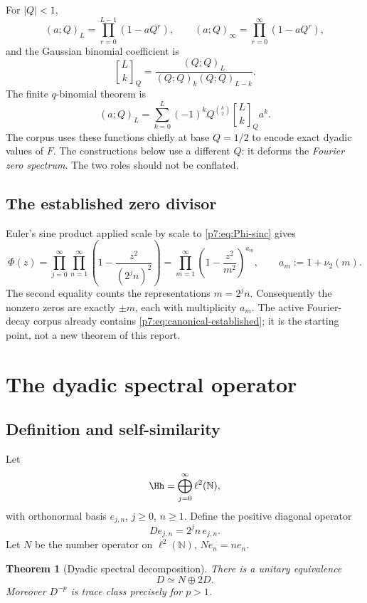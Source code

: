 \documentclass[11pt]{article}
\numberwithin{equation}{section}
\newtheorem{theorem}{Theorem}[section]
\theoremstyle{definition}
\theoremstyle{remark}
\newcommand{\N}{\mathbb N}
\newcommand{\qbinom}[3]{\genfrac{[}{]}{0pt}{}{#1}{#2}_{#3}}
\begin{document}
For $|Q|<1$,
\[
 (a;Q)_L=\prod_{r=0}^{L-1}(1-aQ^r),
 \qquad
 (a;Q)_\infty=\prod_{r=0}^{\infty}(1-aQ^r),
\]
and the Gaussian binomial coefficient is
\[
 \qbinom{L}{k}{Q}=\frac{(Q;Q)_L}{(Q;Q)_k(Q;Q)_{L-k}}.
\]
The finite $q$-binomial theorem is
\begin{equation}\label{p7:eq:q-binomial}
 (a;Q)_L=\sum_{k=0}^{L}(-1)^kQ^{\binom{k}{2}}
 \qbinom{L}{k}{Q}a^k.
\end{equation}
The corpus uses these functions chiefly at base $Q=1/2$ to encode exact dyadic values of $F$.  The constructions below use a different $Q$: it deforms the \emph{Fourier zero spectrum}.  The two roles should not be conflated.

\subsection{The established zero divisor}

Euler's sine product applied scale by scale to \cref{p7:eq:Phi-sinc} gives
\begin{equation}\label{p7:eq:canonical-established}
 \Phi(z)=\prod_{j=0}^{\infty}\prod_{n=1}^{\infty}
 \left(1-\frac{z^2}{(2^jn)^2}\right)
 =\prod_{m=1}^{\infty}
 \left(1-\frac{z^2}{m^2}\right)^{a_m},
 \qquad a_m:=1+\nu_2(m).
\end{equation}
The second equality counts the representations $m=2^jn$.  Consequently the nonzero zeros are exactly $\pm m$, each with multiplicity $a_m$.  The active Fourier-decay corpus already contains \cref{p7:eq:canonical-established}; it is the starting point, not a new theorem of this report.

\section{The dyadic spectral operator}

\subsection{Definition and self-similarity}

Let
\[
 \Hh=\bigoplus_{j=0}^{\infty}\ell^2(\N),
\]
with orthonormal basis $e_{j,n}$, $j\ge0$, $n\ge1$.  Define the positive diagonal operator
\begin{equation}\label{p7:eq:D-def}
 De_{j,n}=2^jn\,e_{j,n}.
\end{equation}
Let $N$ be the number operator on $\ell^2(\N)$, $Ne_n=ne_n$.

\begin{theorem}[Dyadic spectral decomposition]\label{p7:thm:D-decomp}
There is a unitary equivalence
\begin{equation}\label{p7:eq:D-decomp}
 D\simeq N\oplus2D.
\end{equation}
Moreover $D^{-p}$ is trace class precisely for $p>1$.
\end{theorem}
\end{document}
